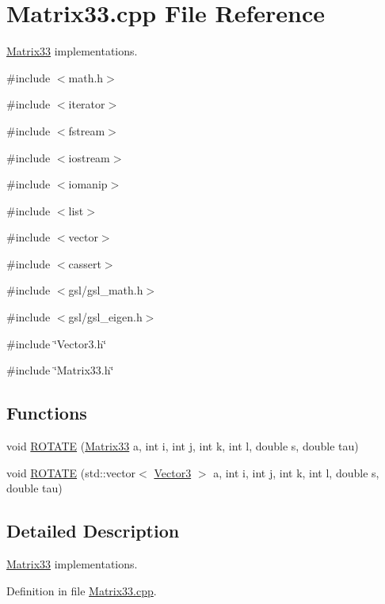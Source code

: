 \section{Matrix33.cpp File Reference}
\label{Matrix33_8cpp}


\hyperlink{classMatrix33}{Matrix33} implementations.  


{\ttfamily \#include $<$math.h$>$}\par
{\ttfamily \#include $<$iterator$>$}\par
{\ttfamily \#include $<$fstream$>$}\par
{\ttfamily \#include $<$iostream$>$}\par
{\ttfamily \#include $<$iomanip$>$}\par
{\ttfamily \#include $<$list$>$}\par
{\ttfamily \#include $<$vector$>$}\par
{\ttfamily \#include $<$cassert$>$}\par
{\ttfamily \#include $<$gsl/gsl\_\-math.h$>$}\par
{\ttfamily \#include $<$gsl/gsl\_\-eigen.h$>$}\par
{\ttfamily \#include \char`\"{}Vector3.h\char`\"{}}\par
{\ttfamily \#include \char`\"{}Matrix33.h\char`\"{}}\par
\subsection*{Functions}
\begin{DoxyCompactItemize}
\item 
void \hyperlink{Matrix33_8cpp_a084a0c687232974c9983dfe4f3870190}{ROTATE} (\hyperlink{classMatrix33}{Matrix33} a, int i, int j, int k, int l, double s, double tau)
\item 
void \hyperlink{Matrix33_8cpp_a6b622e086eeab5a5c2ee9c2b8465a71d}{ROTATE} (std::vector$<$ \hyperlink{classVector3}{Vector3} $>$ a, int i, int j, int k, int l, double s, double tau)
\end{DoxyCompactItemize}


\subsection{Detailed Description}
\hyperlink{classMatrix33}{Matrix33} implementations. 

Definition in file \hyperlink{Matrix33_8cpp_source}{Matrix33.cpp}.



